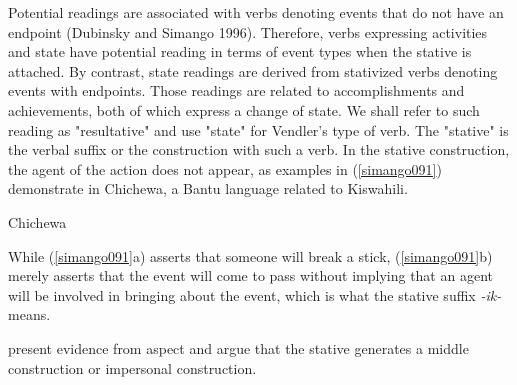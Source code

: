 \documentclass[output=paper]{langscibook}
\begin{document}
Potential readings are associated with verbs denoting events that do not have an endpoint (Dubinsky and Simango 1996). Therefore, verbs expressing activities and state have potential reading in terms of event types when the stative is attached. By contrast, state readings are derived from stativized verbs denoting events with endpoints. Those readings are related to accomplishments and achievements, both of which express a change of state.  We shall refer to such reading as "resultative" and use "state" for Vendler's type of verb. The "stative" is the verbal suffix or the construction with such a verb. In the stative construction, the agent of the action does not appear, as examples in (\ref{simango091}) demonstrate in Chichewa, a Bantu language related to Kiswahili. 

\begin{exe}
\ex Chichewa \citep[122]{Simango:2009aa} \label{simango091}

\begin{xlist}
\end{xlist}

\end{exe}
While (\ref{simango091}a) asserts that someone will break a stick, (\ref{simango091}b) merely asserts that the event will come to pass without implying that an agent will be involved in bringing about the event, which is what the stative suffix \textit{-ik-} means. 

\citet{SeidlDimitriadis2003} present evidence from aspect and argue that the stative generates a middle construction or impersonal construction. 
\end{document}
